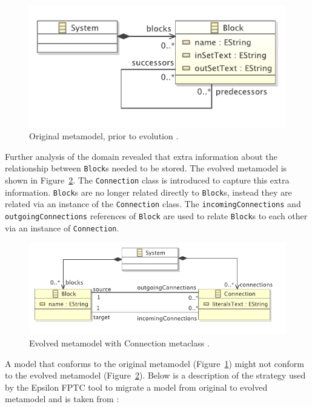 \begin{figure}[htbp]
  \centering
  \includegraphics[scale=0.75]{4.Analysis/fptc_before.pdf}
  \caption[Original metamodel, prior to evolution]{Original metamodel, prior to evolution \cite{rose09analysis}.}
  \label{fig:mm_before}
\end{figure}

Further analysis of the domain revealed that extra information about the relationship between \texttt{Block}s needed to be stored. The evolved metamodel is shown in Figure~\ref{fig:mm_after}. The \texttt{Connection} class is introduced to capture this extra information. \texttt{Block}s are no longer related directly to \texttt{Block}s, instead they are related via an instance of the \texttt{Connection} class. The \texttt{incomingConnections} and \texttt{outgoingConnections} references of \texttt{Block} are used to relate \texttt{Block}s to each other via an instance of \texttt{Connection}.

\begin{figure}[htbp]
  \centering
  \includegraphics[scale=0.75]{4.Analysis/fptc_after.pdf}
  \caption[Evolved metamodel with Connection metaclass]{Evolved metamodel with Connection metaclass \cite{rose09analysis}.}
  \label{fig:mm_after}
\end{figure}

A model that conforms to the original metamodel (Figure~\ref{fig:mm_before}) might not conform to the evolved metamodel (Figure~\ref{fig:mm_after}). Below is a description of the strategy used by the Epsilon FPTC tool to migrate a model from original to evolved metamodel and is taken from \cite{rose09analysis}:

